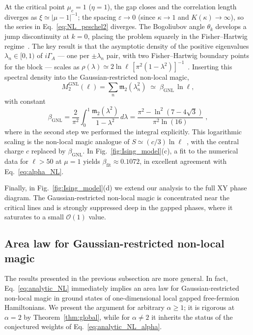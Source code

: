 \documentclass[prx,twocolumn,superscriptaddress,aps,10pt, frontmatterverbose, reprint,footinbib,longbibliography=true]{revtex4-2}
\newcommand{\RENYI}{\alpha}
\begin{document}
At the critical point $\mu_c=1$ ($\eta=1$), the gap closes and the correlation length diverges as $\xi\simeq |\mu-1|^{-1}$; the spacing $\varepsilon \to 0$ (since $\kappa \to 1$ and $K(\kappa) \to \infty$), so the series in Eq.~\eqref{eq:NL_peschel2} diverges.
The Bogoliubov angle $\theta_k$ develops a jump discontinuity at $k = 0$, placing the problem squarely in the Fisher--Hartwig regime~\cite{Jin_2004}.
The key result is that the asymptotic density of the positive eigenvalues $\lambda_n \in [0,1)$  of $i\Gamma_A$ --- one per $\pm\lambda_n$ pair, with two Fisher--Hartwig boundary points for the block --- scales as $\rho(\lambda) \simeq 2\ln\ell\,[\pi^2(1-\lambda^2)]^{-1}$~\cite{Its_2005}.
Inserting this spectral density into the Gaussian-restricted non-local magic,
\begin{equation}
    M_2^{\mathrm{GNL}}(\ell) = \sum_{n} \mathfrak{m}_2(\lambda_n^2)\;\simeq\; \beta_{\mathrm{GNL}}\,\ln\ell,
\end{equation}
with constant
\begin{equation}
    \beta_{\mathrm{GNL}} = \frac{2}{\pi^2}\int_{0}^{1} \frac{\mathfrak{m}_2(\lambda^2)}{1-\lambda^2}\, d\lambda= \frac{\pi ^2-\ln ^2\left(7-4 \sqrt{3}\right)}{\pi ^2 \ln (16)}\;,
    \label{eq:alpha_NL}
\end{equation}
where in the second step we performed the integral explicitly.
This logarithmic scaling is the non-local magic analogue of $S \simeq (c/3)\ln\ell$~\cite{Calabrese2004entanglement}, with the central charge $c$ replaced by $\beta_{\mathrm{GNL}}$.
In Fig.~\ref{fig:Ising_model}(c), a fit to the numerical data for $\ell > 50$ at $\mu = 1$ yields $\beta_{\mathrm{fit}} \approx 0.1072$, in excellent agreement with Eq.~\eqref{eq:alpha_NL}.

Finally, in Fig.~\ref{fig:Ising_model}(d) we extend our analysis to the full XY phase diagram. The Gaussian-restricted non-local magic is concentrated near the critical lines and is strongly suppressed deep in the gapped phases, where it saturates to a small $\mathcal{O}(1)$ value.

\subsection{Area law for Gaussian-restricted non-local magic}
\label{sec:GNL_area_law}
The results presented in the previous subsection are more general. In fact,  Eq.~\eqref{eq:analytic_NL} immediately implies an area law for Gaussian-restricted non-local magic in ground states of one-dimensional local gapped free-fermion Hamiltonians. We present the argument for arbitrary $\RENYI\ge1$; it is rigorous at $\RENYI=2$ by Theorem~\ref{thm:global}, while for $\RENYI\neq2$ it inherits the status of the conjectured weights of Eq.~\eqref{eq:analytic_NL_alpha}.
\end{document}
